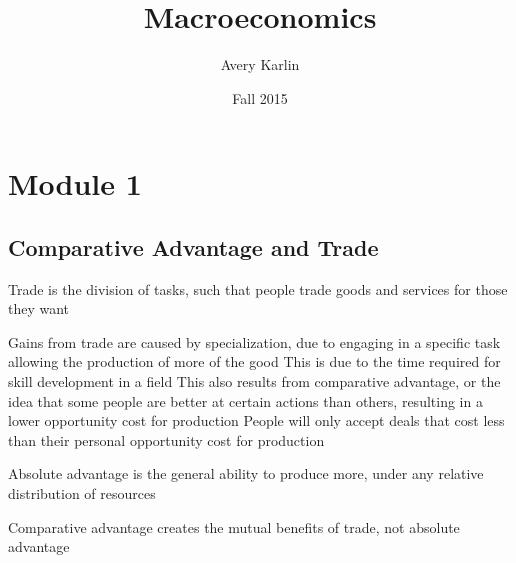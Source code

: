 \documentclass[11 pt, twoside]{article}
\begin{document}
\title{Macroeconomics}
\author{Avery Karlin}
\date{Fall 2015}

\maketitle
\newpage
\tableofcontents
\newpage

\section{Module 1}
\subsection{Comparative Advantage and Trade}
\begin{enumerate}
\note Trade is the division of tasks, such that people trade goods and services for those they want
\begin{enumerate}
\note Gains from trade are caused by specialization, due to engaging in a specific task allowing the production of more of the good
\note This is due to the time required for skill development in a field
\note This also results from comparative advantage, or the idea that some people are better at certain actions than others, resulting in a lower opportunity cost for production
\note People will only accept deals that cost less than their personal opportunity cost for production
\end{enumerate}
\note Absolute advantage is the general ability to produce more, under any relative distribution of resources
\begin{enumerate}
\note Comparative advantage creates the mutual benefits of trade, not absolute advantage
\end{enumerate}
\end{enumerate}
\end{document}
